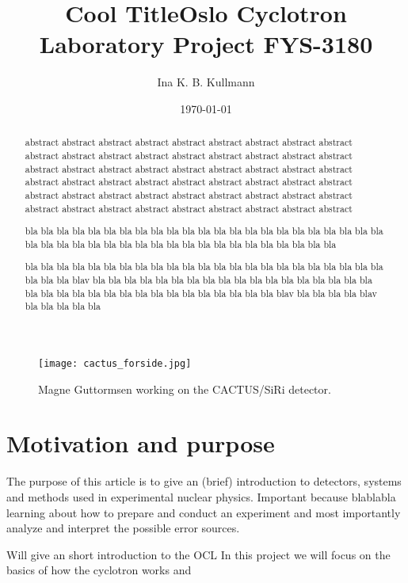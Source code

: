 \documentclass[11pt,a4wide]{article}
\title{{\Huge {\bf Cool Title}}\linebreak \linebreak Oslo Cyclotron Laboratory \linebreak \small{Project FYS-3180}}
\author{Ina K. B. Kullmann}
\date{\today}
\begin{document}
\maketitle

\begin{figure}[htp]
\centering
\texttt{[image: cactus\_forside.jpg]}
\caption{Magne Guttormsen working on the CACTUS/SiRi detector.
}
\label{fig:tull}
\end{figure}

\newpage


\tableofcontents
\newpage

\begin{abstract}
abstract abstract abstract abstract abstract abstract abstract abstract abstract abstract abstract abstract abstract abstract abstract abstract abstract abstract abstract abstract abstract abstract abstract abstract abstract abstract abstract abstract abstract abstract abstract abstract abstract abstract abstract abstract abstract abstract abstract abstract abstract abstract abstract abstract abstract abstract abstract abstract abstract abstract abstract abstract abstract abstract 

bla bla bla bla bla bla bla bla bla bla bla bla bla bla bla bla bla bla bla bla bla bla bla bla bla bla bla bla bla bla bla bla bla bla bla bla bla bla bla bla bla bla bla 

bla bla bla bla bla bla bla bla bla bla bla bla bla bla bla bla bla bla bla bla bla bla bla bla bla bla blav bla bla bla bla bla bla bla bla bla bla bla bla bla bla bla bla bla bla bla bla bla bla bla bla bla bla bla bla bla bla bla bla bla bla blav bla bla bla bla blav bla bla bla bla bla
\end{abstract}


\section{Motivation and purpose}
The purpose of this article is to give an (brief) introduction to detectors, systems and methods used in experimental nuclear physics. Important because blablabla learning about how to prepare and conduct an experiment and most importantly analyze and interpret the possible error sources.

Will give an short introduction to the OCL
In this project we will focus on the basics of how the cyclotron works and 
\end{document}
